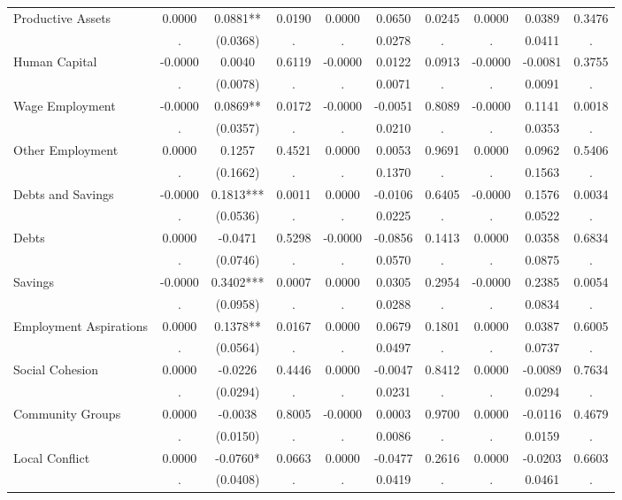\begin{tabular}{l*{9}{c}}
Productive Assets & 0.0000 & 0.0881** & 0.0190 & 0.0000 & 0.0650 & 0.0245 & 0.0000 & 0.0389 & 0.3476 \\
  & . & (0.0368) & . & . & 0.0278 & . & . & 0.0411 & . \\
Human Capital & -0.0000 & 0.0040 & 0.6119 & -0.0000 & 0.0122 & 0.0913 & -0.0000 & -0.0081 & 0.3755 \\
  & . & (0.0078) & . & . & 0.0071 & . & . & 0.0091 & . \\
Wage Employment & -0.0000 & 0.0869** & 0.0172 & -0.0000 & -0.0051 & 0.8089 & -0.0000 & 0.1141 & 0.0018 \\
  & . & (0.0357) & . & . & 0.0210 & . & . & 0.0353 & . \\
Other Employment & 0.0000 & 0.1257 & 0.4521 & 0.0000 & 0.0053 & 0.9691 & 0.0000 & 0.0962 & 0.5406 \\
  & . & (0.1662) & . & . & 0.1370 & . & . & 0.1563 & . \\
Debts and Savings & -0.0000 & 0.1813*** & 0.0011 & 0.0000 & -0.0106 & 0.6405 & -0.0000 & 0.1576 & 0.0034 \\
  & . & (0.0536) & . & . & 0.0225 & . & . & 0.0522 & . \\
Debts & 0.0000 & -0.0471 & 0.5298 & -0.0000 & -0.0856 & 0.1413 & 0.0000 & 0.0358 & 0.6834 \\
  & . & (0.0746) & . & . & 0.0570 & . & . & 0.0875 & . \\
Savings & -0.0000 & 0.3402*** & 0.0007 & 0.0000 & 0.0305 & 0.2954 & -0.0000 & 0.2385 & 0.0054 \\
  & . & (0.0958) & . & . & 0.0288 & . & . & 0.0834 & . \\
Employment Aspirations & 0.0000 & 0.1378** & 0.0167 & 0.0000 & 0.0679 & 0.1801 & 0.0000 & 0.0387 & 0.6005 \\
  & . & (0.0564) & . & . & 0.0497 & . & . & 0.0737 & . \\
Social Cohesion & 0.0000 & -0.0226 & 0.4446 & 0.0000 & -0.0047 & 0.8412 & 0.0000 & -0.0089 & 0.7634 \\
  & . & (0.0294) & . & . & 0.0231 & . & . & 0.0294 & . \\
Community Groups & 0.0000 & -0.0038 & 0.8005 & -0.0000 & 0.0003 & 0.9700 & 0.0000 & -0.0116 & 0.4679 \\
  & . & (0.0150) & . & . & 0.0086 & . & . & 0.0159 & . \\
Local Conflict & 0.0000 & -0.0760* & 0.0663 & 0.0000 & -0.0477 & 0.2616 & 0.0000 & -0.0203 & 0.6603 \\
  & . & (0.0408) & . & . & 0.0419 & . & . & 0.0461 & . \\

\end{tabular}
